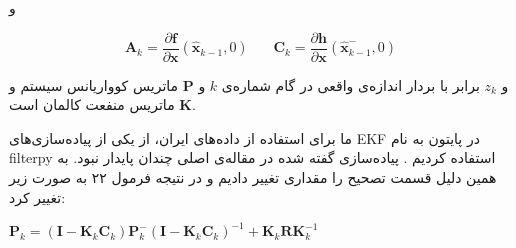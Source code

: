 \documentclass[11pt, fleqn]{article}
\begin{document}
\begin{multicols}{2}
و


\useshortskip
\begin{LTR}
\begin{equation}
\label{24}
\mathbf{A}_k = \frac{\partial \mathbf{f}}{\partial \mathbf{x}}(\hat{\mathbf{x}}_{k-1},0) \ \ \ \ \ \ \ \ \mathbf{C}_k =  \frac{\partial \mathbf{h}}{\partial \mathbf{x}}(\hat{\mathbf{x}}^{-}_{k-1},0)
\end{equation}
\end{LTR}

و
$z_k$
برابر با بردار‌ اندازه‌ی واقعی در گام شماره‌ی
$k$
و
 $\mathbf{P}$ 
 ماتریس کوواریانس سیستم و 
  $\mathbf{K}$ 
   ماتریس منفعت کالمان 
  است. 


ما برای استفاده از داده‌های ایران، از یکی از پیاده‌سازی‌های 
EKF
در پایتون به نام 
filterpy
استفاده کردیم
\cite{s1}
. پیاده‌سازی گفته شده در مقاله‌ی اصلی چندان پایدار نبود. به همین دلیل قسمت تصحیح را مقداری تغییر دادیم و در نتیجه فرمول ۲۲ به صورت زیر تغییر کرد:

\begin{latin}
$\mathbf{P}_k = (\mathbf{I} - \mathbf{K}_{k} \mathbf{C}_{k}
)\mathbf{P}^{-}_{k} (\mathbf{I} - \mathbf{K}_{k} \mathbf{C}_{k}
)^{-1} + \mathbf{K}_k \mathbf{R} \mathbf{K}_k^{-1} $
\end{latin}























\end{multicols}
\end{document}
